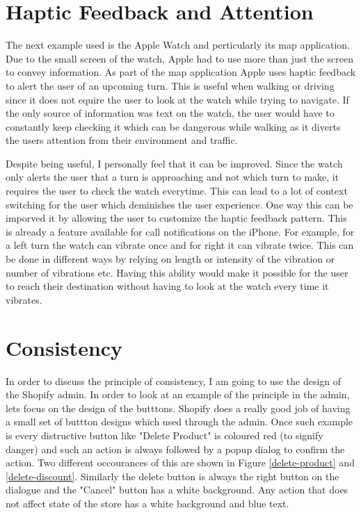\documentclass[12pt]{article}
\begin{document}
	\section{Haptic Feedback and Attention}
	The next example used is the Apple Watch and perticularly its map application. Due to the small screen of the watch, Apple had to use more than just the screen to convey information. As part of the map application Apple uses haptic feedback to alert the user of an upcoming turn. This is useful when walking or driving since it does not equire the user to look at the watch while trying to navigate. If the only source of information was text on the watch, the user would have to constantly keep checking it which can be dangerous while walking as it diverts the users attention from their environment and traffic. 
	
	Despite being useful, I personally feel that it can be improved. Since the watch only alerts the user that a turn is approaching and not which turn to make, it requires the user to check the watch everytime. This can lead to a lot of context switching for the user which deminishes the user experience. One way this can be imporved it by allowing the user to customize the haptic feedback pattern. This is already a feature available for call notifications on the iPhone. For example, for a left turn the watch can vibrate once and for right it can vibrate twice. This can be done in different ways by relying on length or intensity of the vibration or number of vibrations etc. Having this ability would make it possible for the user to reach their destination without having to look at the watch every time it vibrates.
	
	\section{Consistency}
	In order to discuss the principle of consistency, I am going to use the design of the Shopify admin. In order to look at an example of the principle in the admin, lets focus on the design of the butttons. Shopify does a really good job of having a small set of buttton designs which used through the admin. Once such example is every distructive button like "Delete Product" is coloured red (to signify danger) and such an action is always followed by a popup dialog to confirm the action. Two different occourances of this are shown in Figure \ref{delete-product} and \ref{delete-discount}. Similarly the delete button is always the right button on the dialogue and the "Cancel" button has a white background. Any action that does not affect state of the store has a white background and blue text. 
	
\end{document}
